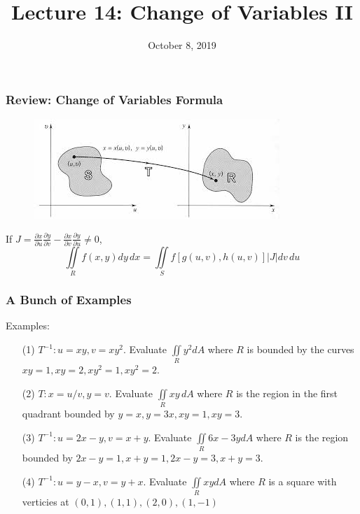 \documentclass{beamer}
\title{Lecture 14: Change of Variables II}
\date{October 8, 2019}
\begin{document}
	
\frame{\titlepage}


\begin{frame}
\frametitle{Review: Change of Variables Formula}
\begin{figure}
	
	\includegraphics[width=.9\textheight]{vmap.jpg}\\
	\hspace*{10pt}\hbox{}
\end{figure}
If $J = \frac{\partial x}{\partial u} \frac{\partial y}{\partial v}-	\frac{\partial x}{\partial v}\frac{\partial y}{\partial u} \neq 0$,
$$\iint\limits_{R} f(x,y)dy\,dx = \iint\limits_{S} f[g(u,v),h(u,v)] |J| dv\,du$$


\end{frame}

\begin{frame}
\frametitle{A Bunch of Examples}
Examples:
\begin{itemize}
	\item[(1)] $T^{-1}: u=xy,v=xy^2$. Evaluate $\iint\limits_{R} y^2 dA$ where $R$ is bounded by the curves $xy=1,xy=2,xy^2=1,xy^2=2$.
	\item[(2)]$T: x=u/v, y=v$. Evaluate $\iint\limits_{R} xy \,dA$ where $R$ is the region in the first quadrant bounded by $y=x,y=3x,xy=1,xy=3$.
	\item[(3)]$T^{-1}: u=2x-y,v=x+y$. Evaluate $\iint\limits_{R} 6x-3y dA$ where $R$ is the region bounded by $2x-y=1,x+y=1,2x-y=3,x+y=3$.
	\item[(4)]$T^{-1}: u=y-x,v=y+x$. Evaluate $\iint\limits_{R} xy dA$ where $R$ is a square with verticies at $(0,1),(1,1),(2,0),(1,-1)$
\end{itemize}
\end{frame}
\end{document}
